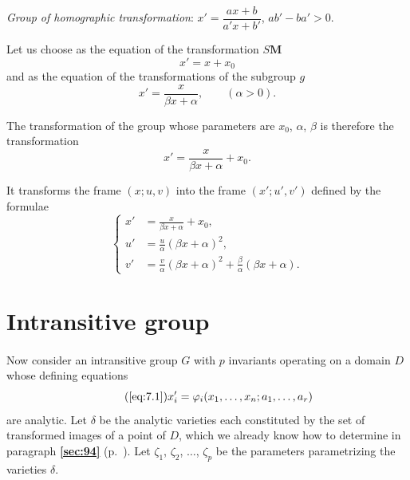 \documentclass[leqno,11pt]{book}
\makeatletter
\numberwithin{equation}{chapter}
\theoremstyle{shape1}
\theoremstyle{shapesmall}
\let\old@phi\phi
\let\old@varphi\varphi
\let\phi\old@varphi
\let\varphi\old@phi
\newcommand{\fsref}[1]{{\rm\textsection\textbf{\ref{sec:#1}}}}
\newcommand{\somespace}{\vspace{9pt}}
\makeatother
\begin{document}
{\somespace

\emph{Group of homographic transformation}: $x'=\dfrac{ax+b}{a'x+b'}$, $ab'-ba'>0$.

Let us choose as the equation of the transformation $S\mathbf{M}$
\[
x'=x+x_{0}
\]
and as the equation of the transformations of the subgroup $g$
\[
x'=\frac{x}{\beta x+\alpha},\qquad(\alpha>0).
\]

The transformation of the group whose parameters are $x_{0}$, $\alpha$, $\beta$ is therefore the transformation
\begin{equation}
  \label{eq:7.7}
  x'=\frac{x}{\beta x+\alpha}+x_{0}.
\end{equation}

It transforms the frame $(x;u,v)$ into the frame $(x';u',v')$ defined by the formulae
\begin{equation}
  \label{eq:7.8}
  \left\{
    \begin{aligned}
      x'&=\frac{x}{\beta x+\alpha}+x_{0},\\
      u'&=\frac{u}{\alpha}(\beta x+\alpha)^{2},\\
      v'&=\frac{v}{\alpha}(\beta x+\alpha)^{2}+\frac{\beta}{\alpha}(\beta x+\alpha).
    \end{aligned}
  \right.
\end{equation}
}



\section{Intransitive group}
\label{sec:intransitive-group}

\paragraph{}
\label{sec:103}
Now consider an intransitive group $G$ with $p$ invariants operating on a domain $D$ whose defining equations
\begin{equation}
  \label{eq:7.1a}\tag{\ref{eq:7.1}}
  x'_{i}=\phi_{i}(x_{1},\dots,x_{n};a_{1},\dots,a_{r})
\end{equation}
are analytic. Let $\delta$ be the analytic varieties each constituted by the set of transformed images of a point of $D$, which we already know how to determine in paragraph \fsref{94} (p.~\pageref{sec:94}). Let $\zeta_{1}$, $\zeta_{2}$, $\dots$, $\zeta_{p}$ be the parameters parametrizing the varieties $\delta$.
\end{document}
